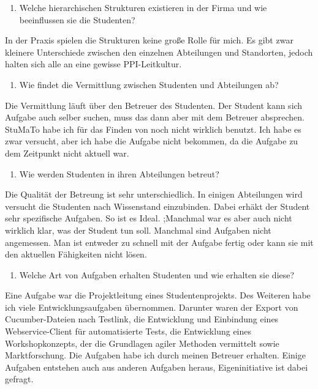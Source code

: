 \documentclass[
  12pt,
  ngerman,
  a4paper,
]{article}
\providecommand{\tightlist}{%
  \setlength{\itemsep}{0pt}\setlength{\parskip}{0pt}}
\begin{document}
\begin{enumerate}
\def\labelenumi{\arabic{enumi}.}
\setcounter{enumi}{3}
\tightlist
\item
  Welche hierarchischen Strukturen existieren in der Firma und wie
  beeinflussen sie die Studenten?
\end{enumerate}

In der Praxis spielen die Strukturen keine große Rolle für mich. Es gibt
zwar kleinere Unterschiede zwischen den einzelnen Abteilungen und
Standorten, jedoch halten sich alle an eine gewisse PPI-Leitkultur.

\begin{enumerate}
\def\labelenumi{\arabic{enumi}.}
\setcounter{enumi}{4}
\tightlist
\item
  Wie findet die Vermittlung zwischen Studenten und Abteilungen ab?
\end{enumerate}

Die Vermittlung läuft über den Betreuer des Studenten. Der Student kann
sich Aufgabe auch selber suchen, muss das dann aber mit dem Betreuer
absprechen. StuMaTo habe ich für das Finden von noch nicht wirklich
benutzt. Ich habe es zwar versucht, aber ich habe die Aufgabe nicht
bekommen, da die Aufgabe zu dem Zeitpunkt nicht aktuell war.

\begin{enumerate}
\def\labelenumi{\arabic{enumi}.}
\setcounter{enumi}{5}
\tightlist
\item
  Wie werden Studenten in ihren Abteilungen betreut?
\end{enumerate}

Die Qualität der Betreung ist sehr unterschiedlich. In einigen
Abteilungen wird versucht die Studenten nach Wissenstand einzubinden.
Dabei erhäkt der Student sehr spezifische Aufgaben. So ist es Ideal.
;Manchmal war es aber auch nicht wirklich klar, was der Student tun
soll. Manchmal sind Aufgaben nicht angemessen. Man ist entweder zu
schnell mit der Aufgabe fertig oder kann sie mit den aktuellen
Fähigkeiten nicht lösen.

\begin{enumerate}
\def\labelenumi{\arabic{enumi}.}
\setcounter{enumi}{6}
\tightlist
\item
  Welche Art von Aufgaben erhalten Studenten und wie erhalten sie diese?
\end{enumerate}

Eine Aufgabe war die Projektleitung eines Studentenprojekts. Des
Weiteren habe ich viele Entwicklungsaufgaben übernommen. Darunter waren
der Export von Cucumber-Dateien nach Testlink, die Entwicklung und
Einbindung eines Webservice-Client für automatisierte Tests, die
Entwicklung eines Workshopkonzepts, der die Grundlagen agiler Methoden
vermittelt sowie Marktforschung. Die Aufgaben habe ich durch meinen
Betreuer erhalten. Einige Aufgaben entstehen auch aus anderen Aufgaben
heraus, Eigeninitiative ist dabei gefragt.
\end{document}
